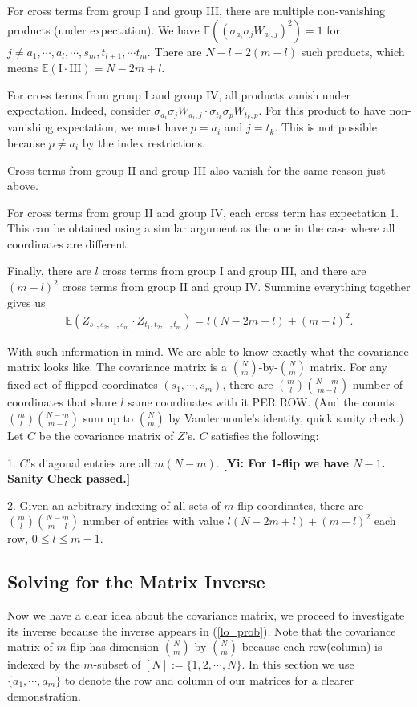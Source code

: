 \documentclass[10pt]{article}
\newcommand{\e}{\mathbb{E}}
\newcommand{\gy}[1]{\textbf{\color{red}[Yi: #1]}}
\newenvironment{Proof of lemma}{\noindent{\bf Proof of Lemma}}{\hfill$\Box$\newline}
\newenvironment{Proof of claim}{\noindent{\bf Proof of claim}}{\hfill$\Box$\newline}
\newenvironment{Proof of theorem}{\noindent{\bf Proof of Theorem}}{\hfill\scriptsize{$\Box$}\newline}
\newenvironment{Proof of theorems}{\noindent{\bf Proof of Theorems}}{\hfill$\Box$\newline}
\newenvironment{Proof of proposition}{\noindent{\bf Proof of Proposition}}{\hfill$\Box$\newline}
\newenvironment{Proof of propositions}{\noindent{\bf Proof of Propositions}}{\hfill$\Box$\newline}
\newenvironment{Proof of exercise}{\noindent{\it Proof of Exercise:}}{\hfill$\Box$}
\numberwithin{equation}{section}
\begin{document}
For cross terms from group I and group III, there are multiple non-vanishing products (under expectation). We have $\e \left((\sigma_{a_i} \sigma_j W_{a_i,j})^2 \right) = 1$ for $j \neq a_1,\cdots,a_l,\cdots,s_m, t_{l+1}, \cdots t_m$. There are $N - l - 2(m-l)$ such products, which means $\e(\text{I} \cdot \text{III}) = N -2m +l$.

For cross terms from group I and group IV, all products vanish under expectation. Indeed, consider $\sigma_{a_i} \sigma_j W_{a_i,j} \cdot \sigma_{t_k} \sigma_p W_{t_k,p}$. For this product to have non-vanishing expectation, we must have $p = a_i$ and $j = t_k$. This is not possible because $p \neq a_i$ by the index restrictions.

Cross terms from group II and group III also vanish for the same reason just above.

For cross terms from group II and group IV, each cross term has expectation 1. This can be obtained using a similar argument as the one in the case where all coordinates are different.

Finally, there are $l$ cross terms from group I and group III, and there are $(m-l)^2$ cross terms from group II and group IV. Summing everything together gives us
\begin{align} \label{covar_entry}
    \e(Z_{s_1,s_2,\cdots,s_m} \cdot Z_{t_1,t_2,\cdots,t_m}) = l(N-2m+l) + (m-l)^2.
\end{align}

With such information in mind. We are able to know exactly what the covariance matrix looks like. The covariance matrix is a $\binom{N}{m}$-by-$\binom{N}{m}$ matrix. For any fixed set of flipped coordinates $(s_1,\cdots,s_m)$, there are $\binom{m}{l}\binom{N-m}{m-l}$ number of coordinates that share $l$ same coordinates with it PER ROW. (And the counts $\binom{m}{l}\binom{N-m}{m-l}$ sum up to $\binom{N}{m}$ by Vandermonde's identity, quick sanity check.) Let $C$ be the covariance matrix of $Z$'s. $C$ satisfies the following:

1. $C$'s diagonal entries are all $m(N-m)$. \gy{For 1-flip we have $N-1$. Sanity Check passed.}

2. Given an arbitrary indexing of all sets of $m$-flip coordinates, there are $\binom{m}{l}\binom{N-m}{m-l}$ number of entries with value $l(N-2m+l) + (m-l)^2$ each row, $0 \leq l \leq m-1$.
\subsection{Solving for the Matrix Inverse} \label{m-flip roadblock}
Now we have a clear idea about the covariance matrix, we proceed to investigate its inverse because the inverse appears in (\ref{lo_prob}). Note that the covariance matrix of $m$-flip has dimension $\binom{N}{m}$-by-$\binom{N}{m}$ because each row(column) is indexed by the $m$-subset of $[N] :=\{1,2,\cdots,N\}$. In this section we use $\{a_1,\cdots, a_m\}$ to denote the row and column of our matrices for a clearer demonstration.
\end{document}
